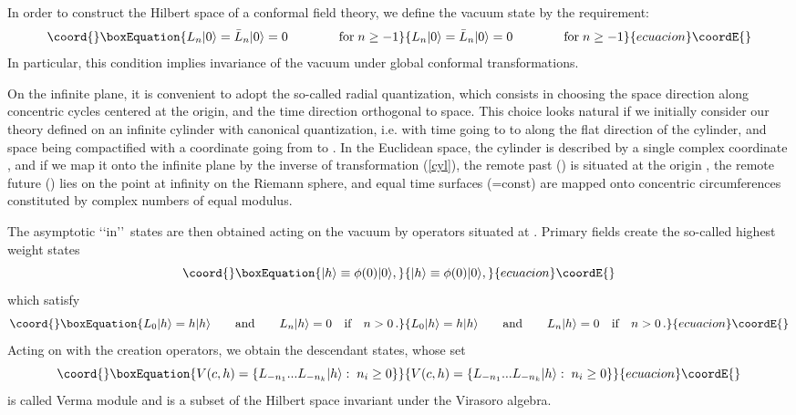 \documentclass[a4paper,12pt]{report}
\begin{document}
In order to construct the Hilbert space of a conformal field theory, we define the vacuum state \myHighlight{$|0\rangle$}\coordHE{} by
the requirement:
\begin{equation}\coord{}\boxEquation{\label{vacuum}
L_{n}|0\rangle=\bar{L}_{n}|0\rangle=0\qquad\qquad\textrm{for}\;n\geq -1
}{L_{n}|0\rangle=\bar{L}_{n}|0\rangle=0\qquad\qquad\textrm{for}\;n\geq -1
}{ecuacion}\coordE{}\end{equation}
In particular, this condition implies invariance of the vacuum under global conformal transformations.

On the infinite plane, it is convenient to adopt the so-called radial quantization, which consists in choosing
the space direction along concentric cycles centered at the origin, and the time direction orthogonal to space.
This choice looks natural if we initially consider our theory defined on an infinite cylinder with canonical
quantization, i.e. with time \coordHE{} going to \myHighlight{$-\infty$}\coordHE{} to \myHighlight{$+\infty$}\coordHE{} along the flat direction of the cylinder, and
space being compactified with a coordinate \coordHE{} going from \coordHE{} to \coordHE{}. In the Euclidean space, the cylinder is
described by a single complex coordinate \coordHE{}, and if we map it onto the infinite plane by the inverse of
transformation (\ref{cyl}), the remote past (\coordHE{}) is situated at the origin \coordHE{}, the remote
future (\coordHE{}) lies on the point at infinity on the Riemann sphere, and equal time surfaces
(\coordHE{}=const) are mapped onto concentric circumferences constituted by complex numbers of equal modulus.

The asymptotic \lq\lq in\rq\rq\, states are then obtained acting on the vacuum by operators situated at \coordHE{}.
Primary fields create the so-called highest weight states
\begin{equation}\coord{}\boxEquation{\label{hwst}
|h\rangle\equiv \phi(0)|0\rangle,
}{|h\rangle\equiv \phi(0)|0\rangle,
}{ecuacion}\coordE{}\end{equation}
which satisfy
\begin{equation}\coord{}\boxEquation{
L_{0}|h\rangle=h|h\rangle\qquad\textrm{and}\qquad L_{n}|h\rangle=0\quad\textrm{if}\quad n>0 \,.
}{
L_{0}|h\rangle=h|h\rangle\qquad\textrm{and}\qquad L_{n}|h\rangle=0\quad\textrm{if}\quad n>0 \,.
}{ecuacion}\coordE{}\end{equation}
Acting on \coordHE{} with the creation operators, we obtain the descendant states, whose set
\begin{equation}\coord{}\boxEquation{\label{verma}
V(c,h)=\left\{L_{-n_{1}}...L_{-n_{k}}|h\rangle:\;n_{i}\geq 0\right\}
}{V(c,h)=\left\{L_{-n_{1}}...L_{-n_{k}}|h\rangle:\;n_{i}\geq 0\right\}
}{ecuacion}\coordE{}\end{equation}
is called Verma module and is a subset of the Hilbert space invariant under the Virasoro algebra.
\end{document}
